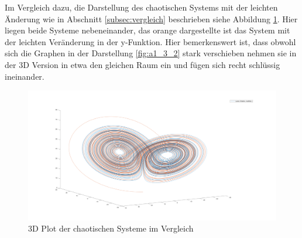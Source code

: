 \documentclass[]{scrartcl}
\begin{document}
Im Vergleich dazu, die Darstellung des chaotischen Systems mit der leichten Änderung wie in Abschnitt \ref{subsec:vergleich} beschrieben siehe Abbildung \ref{fig:a1_3_4}. Hier liegen beide Systeme nebeneinander, das orange dargestellte ist das System mit der leichten Veränderung in der y-Funktion. Hier bemerkenswert ist, dass obwohl sich die Graphen in der Darstellung \ref{fig:a1_3_2} stark verschieben nehmen sie in der 3D Version in etwa den gleichen Raum ein und fügen sich recht schlüssig ineinander.

\begin{figure}[H]
	\centering
	\includegraphics[width=1\linewidth]{a1_3_4}
	\caption{3D Plot der chaotischen Systeme im Vergleich}
	\label{fig:a1_3_4}
\end{figure}
\end{document}
